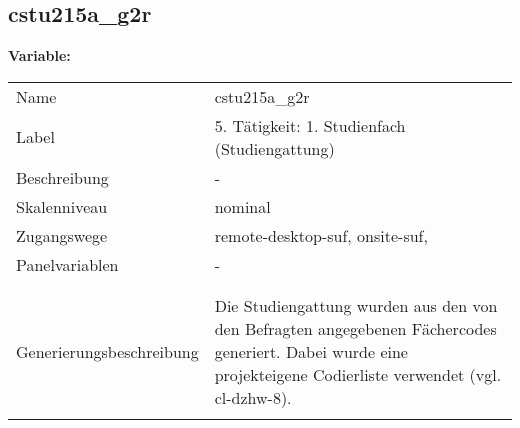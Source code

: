 	
	
	\subsection{cstu215a\_g2r}
	\label{subSection:cstu215a_g2r}

	\noindent\textbf{Variable:}\\
		\begin{tabular}{lL{11.3cm}}
			\label{tableVariable:cstu215a_g2r}
			Name & cstu215a\_g2r \\
			Label & 5. Tätigkeit: 1. Studienfach (Studiengattung) \\
			Beschreibung & - \\
			Skalenniveau & nominal \\
			Zugangswege &
				remote-desktop-suf,
				onsite-suf,
 \\
			Panelvariablen & -
			 \\
			 \\
 \\
					Generierungsbeschreibung & Die Studiengattung wurden aus den von den Befragten angegebenen Fächercodes generiert.  Dabei wurde eine projekteigene Codierliste verwendet (vgl. cl-dzhw-8).
				 \\	
			 \\
		\end{tabular}






